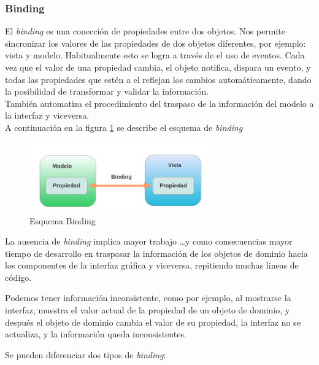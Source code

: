 

\subsubsection{Binding}

	El \emph{binding} es una conección de propiedades entre dos objetos. 
	Nos permite sincronizar los valores de las propiedades de dos objetos
	diferentes, por ejemplo: vista y modelo. Habitualmente esto se logra a través de
	el uso de eventos.
	Cada vez que el valor de una propiedad cambia, el objeto notifica, dispara un
	evento, y todas las propiedades que estén  a el
	reflejan los cambios automáticamente, dando la posibilidad de transformar y
	validar la información.\\
	También automatiza el procedimiento del traspaso de la información del
	modelo a la interfaz y viceversa.\\
	
	A continuación en la figura \ref{binding} se describe el esquema de
		\emph{binding}
		
		\begin{figure}[h]
			\includegraphics[width=300px]{img/binding}
			\caption{Esquema Binding}
			\label{binding}
		\end{figure}
		
		\bigskip
	
	La ausencia de \emph{binding} implica mayor trabajo \ldots y como consecuencias
	 mayor tiempo de desarrollo en  traspasar la información de los
	objetos de dominio hacia los componentes de la interfaz gráfica y viceversa, repitiendo muchas lineas de código.
	
	Podemos tener información inconsistente, como por ejemplo, al mostrarse la interfaz,
	muestra el valor actual de la propiedad de un objeto de dominio, y después el
	objeto de dominio cambia el valor de su propiedad, la interfaz no se actualiza,
	y la información queda inconsistentes.
	
	\bigskip
	
	Se pueden diferenciar dos tipos de \emph{binding}:
	

